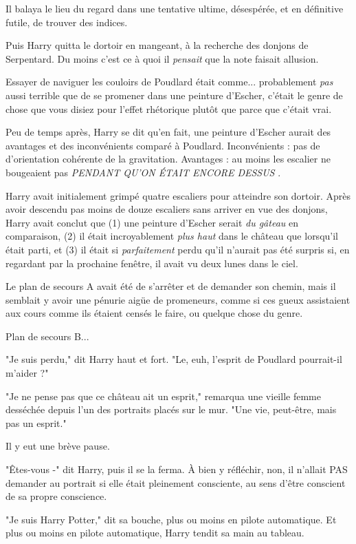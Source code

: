 Il balaya le lieu du regard dans une tentative ultime, désespérée, et en définitive futile, de trouver des indices.

Puis Harry quitta le dortoir en mangeant, à la recherche des donjons de Serpentard. Du moins c'est ce à quoi il \emph{pensait}  que la note faisait allusion.

Essayer de naviguer les couloirs de Poudlard était comme... probablement \emph{pas}  aussi terrible que de se promener dans une peinture d'Escher, c'était le genre de chose que vous disiez pour l'effet rhétorique plutôt que parce que c'était vrai.

Peu de temps après, Harry se dit qu'en fait, une peinture d'Escher aurait des avantages et des inconvénients comparé à Poudlard. Inconvénients : pas de d'orientation cohérente de la gravitation. Avantages : au moins les escalier ne bougeaient pas \emph{PENDANT QU'ON ÉTAIT ENCORE DESSUS} .

Harry avait initialement grimpé quatre escaliers pour atteindre son dortoir. Après avoir descendu pas moins de douze escaliers sans arriver en vue des donjons, Harry avait conclut que (1) une peinture d'Escher serait \emph{du gâteau}  en comparaison, (2) il était incroyablement \emph{plus haut}  dans le château que lorsqu'il était parti, et (3) il était si \emph{parfaitement}  perdu qu'il n'aurait pas été surpris si, en regardant par la prochaine fenêtre, il avait vu deux lunes dans le ciel.

Le plan de secours A avait été de s'arrêter et de demander son chemin, mais il semblait y avoir une pénurie aigüe de promeneurs, comme si ces gueux assistaient aux cours comme ils étaient censés le faire, ou quelque chose du genre.

Plan de secours B...

"Je suis perdu," dit Harry haut et fort. "Le, euh, l'esprit de Poudlard pourrait-il m'aider ?"

"Je ne pense pas que ce château ait un esprit," remarqua une vieille femme desséchée depuis l'un des portraits placés sur le mur. "Une vie, peut-être, mais pas un esprit."

Il y eut une brève pause.

"Êtes-vous -" dit Harry, puis il se la ferma. À bien y réfléchir, non, il n'allait PAS demander au portrait si elle était pleinement consciente, au sens d'être conscient de sa propre conscience.

"Je suis Harry Potter," dit sa bouche, plus ou moins en pilote automatique. Et plus ou moins en pilote automatique, Harry tendit sa main au tableau.

